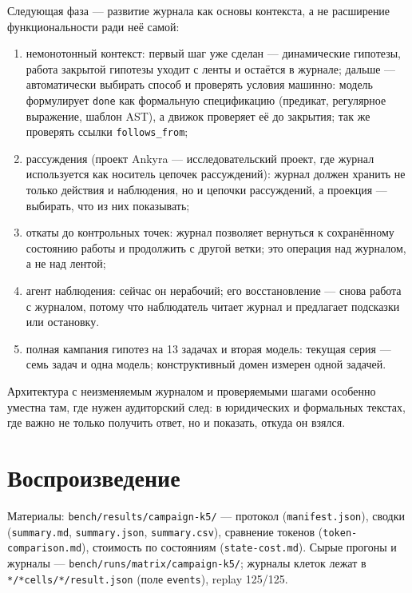 \documentclass[11pt,a4paper]{article}
\begin{document}
Следующая фаза --- развитие журнала как основы контекста, а не расширение функциональности
ради неё самой:
\begin{enumerate}[leftmargin=1.4em,itemsep=0.2em]
  \item немонотонный контекст: первый шаг уже сделан --- динамические гипотезы, работа
  закрытой гипотезы уходит с ленты и остаётся в журнале; дальше --- автоматически выбирать
  способ и проверять условия машинно: модель формулирует \texttt{done} как формальную
  спецификацию (предикат, регулярное выражение, шаблон AST), а движок проверяет её до закрытия;
  так же проверять ссылки \texttt{follows\_from};
  \item рассуждения (проект Ankyra --- исследовательский проект, где журнал используется как
  носитель цепочек рассуждений): журнал должен хранить не только действия и наблюдения, но и
  цепочки рассуждений, а проекция --- выбирать, что из них показывать;
  \item откаты до контрольных точек: журнал позволяет вернуться к сохранённому состоянию
  работы и продолжить с другой ветки; это операция над журналом, а не над лентой;
  \item агент наблюдения: сейчас он нерабочий; его восстановление --- снова работа с
  журналом, потому что наблюдатель читает журнал и предлагает подсказки или остановку.
  \item полная кампания гипотез на 13 задачах и вторая модель: текущая серия --- семь задач
  и одна модель; конструктивный домен измерен одной задачей.
\end{enumerate}

Архитектура с неизменяемым журналом и проверяемыми шагами особенно уместна там, где нужен
аудиторский след: в юридических и формальных текстах, где важно не только получить ответ, но
и показать, откуда он взялся.

\appendix

\section{Воспроизведение}

\begin{sloppypar}
Материалы: \texttt{bench/results/campaign-k5/} --- протокол (\texttt{manifest.json}),
сводки (\texttt{summary.md}, \texttt{summary.json}, \texttt{summary.csv}), сравнение
токенов (\texttt{token-comparison.md}), стоимость по состояниям (\texttt{state-cost.md}).
Сырые прогоны и журналы --- \texttt{bench/runs/matrix/campaign-k5/}; журналы клеток лежат в
\texttt{*/*cells/*/result.json} (поле \texttt{events}), replay 125/125.
\end{sloppypar}
\end{document}
